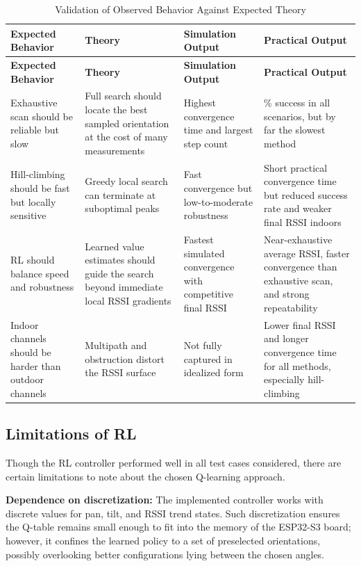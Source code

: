 \vspace{0.5cm}
\renewcommand{\arraystretch}{1.25}
\begin{longtable}{|
>{\raggedright\arraybackslash}p{3.6cm}|
>{\raggedright\arraybackslash}p{4.0cm}|
>{\raggedright\arraybackslash}p{2.95cm}|
>{\raggedright\arraybackslash}p{3.0cm}|}
\caption{Validation of Observed Behavior Against Expected Theory}
\label{tab:theory_sim_practical_validation}\\
\hline
\textbf{Expected Behavior} & \textbf{Theory} & \textbf{Simulation Output} & \textbf{Practical Output} \\
\hline
\endfirsthead
\hline
\textbf{Expected Behavior} & \textbf{Theory} & \textbf{Simulation Output} & \textbf{Practical Output} \\
\hline
\endhead
Exhaustive scan should be reliable but slow & Full search should locate the best sampled orientation at the cost of many measurements & Highest convergence time and largest step count & 100\% success in all scenarios, but by far the slowest method \\
\hline
Hill-climbing should be fast but locally sensitive & Greedy local search can terminate at suboptimal peaks & Fast convergence but low-to-moderate robustness & Short practical convergence time but reduced success rate and weaker final RSSI indoors \\
\hline
RL should balance speed and robustness & Learned value estimates should guide the search beyond immediate local RSSI gradients & Fastest simulated convergence with competitive final RSSI & Near-exhaustive average RSSI, faster convergence than exhaustive scan, and strong repeatability \\
\hline
Indoor channels should be harder than outdoor channels & Multipath and obstruction distort the RSSI surface & Not fully captured in idealized form & Lower final RSSI and longer convergence time for all methods, especially hill-climbing \\
\hline
\end{longtable}

\subsection{Limitations of RL}

Though the RL controller performed well in all test cases considered, there are certain limitations to note about the chosen Q-learning approach.

\textbf{Dependence on discretization:}
The implemented controller works with discrete values for pan, tilt, and RSSI trend states. Such discretization ensures the Q-table remains small enough to fit into the memory of the ESP32-S3 board; however, it confines the learned policy to a set of preselected orientations, possibly overlooking better configurations lying between the chosen angles.

